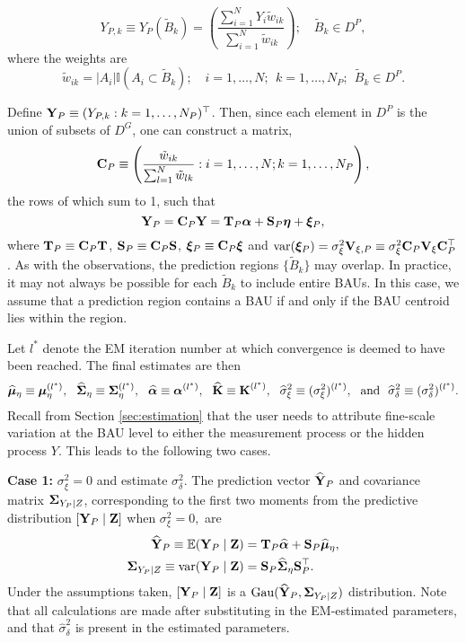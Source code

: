 \begin{equation*}
Y_{P,k} \equiv Y_{P}(\tilde{B}_k) = \left(\frac{\sum_{i =1}^N Y_i \tilde w_{ik}}{\sum_{i=1}^N \tilde w_{ik}}\right); \quad \tilde{B}_k \in D^P,
\end{equation*}
where the weights are
$$ \tilde w_{ik} = |A_i|\mathbb{I}(A_i \subset \tilde{B}_k); \quad i = 1,\dots,N;~~k = 1,\dots, N_P; ~~\tilde{B}_k \in D^P.$$

Define $\mathbf{Y}_P \equiv (Y_{P,k} : k = 1,\dots,N_P)^\top$. Then, since each element in $D^P$ is the union of subsets of $D^G$, one can construct a matrix,
\begin{equation}\label{eq:CP}
\mathbf{C}_P \equiv \left(\frac{\tilde w_{ik}}{\sum_{l=1}^N \tilde w_{lk}} : i = 1,\dots,N; k = 1,\dots,N_P\right),
\end{equation}
the rows of which sum to 1, such that
\begin{equation*}
\mathbf{Y}_P = \mathbf{C}_P\mathbf{Y} = \textbf{T}_P{\boldsymbol{\alpha}} + \textbf{S}_P\boldsymbol{\eta} + {\boldsymbol{\xi}}_P,
\end{equation*}
where $\textbf{T}_P \equiv \mathbf{C}_P \textbf{T}$, $\textbf{S}_P \equiv \mathbf{C}_P \textbf{S}$, ${\boldsymbol{\xi}}_P \equiv \mathbf{C}_P {\boldsymbol{\xi}}$ and $\mathrm{var}({\boldsymbol{\xi}}_P) = \sigma^2_\xi\textbf{V}_{\xi,P} \equiv \sigma^2_\xi\mathbf{C}_P\textbf{V}_\xi\mathbf{C}_P^\top$.  As with the observations, the prediction regions $\{\tilde{B}_k \}$ may overlap. In practice, it may not always be possible for each $\tilde{B}_k$ to include entire BAUs. In this case, we assume that a prediction region contains a BAU if and only if the BAU centroid lies within the region.

Let $l^*$ denote the EM iteration number at which convergence is deemed to have been reached. The final estimates are then
$$\widehat{\boldsymbol{\mu}}_\eta \equiv \boldsymbol{\mu}_\eta^{(l^*)},~~ \widehat{{\bm \Sigma}}_\eta \equiv {\bm \Sigma}_\eta^{(l^*)},~~ \widehat{{\boldsymbol{\alpha}}} \equiv {\boldsymbol{\alpha}}^{(l^*)}, ~~\widehat{\textbf{K}} \equiv \textbf{K}^{(l^*)}, ~~\widehat\sigma^2_\xi \equiv (\sigma^2_\xi)^{(l^*)}, \textrm{~~and~~} \widehat\sigma^2_\delta \equiv (\sigma^2_\delta)^{(l^*)}.$$
Recall from Section \ref{sec:estimation} that the user needs to attribute fine-scale variation at the BAU level to either the measurement process or the hidden process $Y$. This leads to the following two cases.

{\bf Case 1:} $\sigma^2_\xi = 0$ and estimate $\sigma^2_\delta$. The prediction vector $\widehat{\mathbf{Y}}_P$ and covariance matrix ${\bm \Sigma}_{Y_P\mid Z}$, corresponding to the first two moments from the predictive distribution $[\mathbf{Y}_P \mid \mathbf{Z}]$ when $\sigma^2_\xi = 0,$ are
\begin{align*}
\widehat\Yvec_P \equiv \expect(\Yvec_P \mid \Zvec) &= \Tmat_P\widehat\alphab + \Smat_P\widehat\muvec_\eta, \\%
\Sigmamat_{Y_P \mid Z} \equiv \var(\Yvec_P\mid \Zvec) &= \Smat_P \widehat\Sigmamat_\eta\Smat_P^\top. %
\end{align*}
 Under the assumptions taken, $[\mathbf{Y}_P \mid \mathbf{Z}]$ is a $\mathrm{Gau}(\widehat{\mathbf{Y}}_P,{\bm \Sigma}_{Y_P \mid Z})$ distribution. Note that all calculations are made after substituting in the EM-estimated parameters, and that $\widehat\sigma^2_\delta$ is present in the estimated parameters.

